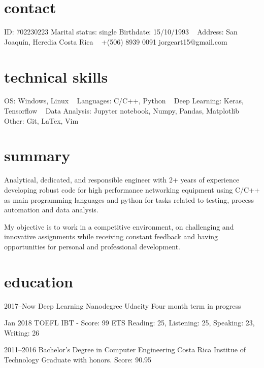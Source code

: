 \documentclass[]{friggeri-cv} %
\begin{document}


\begin{aside} %
\section{contact}
ID: 702230223
Marital status: single
Birthdate: 15/10/1993
~
Address:
San Joaquín, Heredia
Costa Rica
~
+(506) 8939 0091
jorgeart15@gmail.com
~
\section{technical skills}
OS:
Windows, Linux
~
Languages: 
C/C++, Python
~
Deep Learning:
Keras, Tensorflow
~
Data Analysis:
Jupyter notebook, Numpy, Pandas, Matplotlib
~
Other: 
Git, LaTex, Vim
\end{aside}



\section{summary}
Analytical, dedicated, and responsible engineer with 2+ years of experience developing robust code for high performance networking equipment using C/C++ as main programming languages and python for tasks related to testing, process automation and data analysis.

My objective is to work in a competitive environment, on challenging and innovative assignments while receiving constant feedback and having opportunities for personal and professional development.


\section{education}
\begin{entrylist}

\entry
{2017–Now}
{Deep Learning Nanodegree}
{Udacity}
{Four month term in progress}

\entry
{Jan 2018}
{TOEFL IBT {\normalfont - Score: 99}}
{ETS}
{Reading: 25, Listening: 25, Speaking: 23, Writing: 26}

\entry
{2011--2016}
{Bachelor's Degree in Computer Engineering}
{Costa Rica Institue of Technology}
{Graduate with honors. Score: 90.95}

\end{entrylist}
\end{document}
